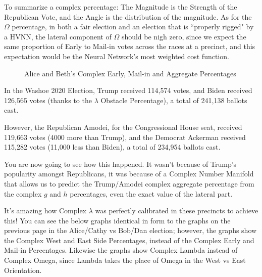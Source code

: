 To summarize a complex percentage: The Magnitude is the Strength of the Republican Vote, and the Angle is the distribution of the magnitude. As for the $\Omega$ percentage, in both a fair election and an election that is ``properly rigged" by a HVNN, the lateral component of $\Omega$ should be nigh zero, since we expect the same proportion of Early to Mail-in votes across the races at a precinct, and this expectation would be the Neural Network's most weighted cost function.
\begin{figure}[bp!]
\begin{center}
\caption{Alice and Beth's Complex Early, Mail-in and Aggregate Percentages}
\noindent{}
\end{center}
\end{figure}
\newpage
In the Washoe 2020 Election, Trump received 114,574 votes, and Biden received 126,565 votes (thanks to the $\lambda$ Obstacle Percentage), a total of 241,138 ballots cast.

However, the Republican Amodei, for the Congressional House seat, received 119,663 votes (4000 more than Trump), and the Democrat Ackerman received 115,282 votes (11,000 less than Biden), a total of 234,954 ballots cast.

You are now going to see how this happened. It wasn't because of Trump's popularity amongst Republicans, it was because of a Complex Number Manifold that allows us to predict the Trump/Amodei complex aggregate percentage from the complex $g$ and $h$ percentages, even the exact value of the lateral part. 

It's amazing how Complex $\lambda$ was perfectly calibrated in these precincts to achieve this! You can see the below graphs identical in form to the graphs on the previous page in the Alice/Cathy vs Bob/Dan election; however, the graphs show the Complex West and East Side Percentages, instead of the Complex Early and Mail-in Percentages. Likewise the graphs show Complex Lambda instead of Complex Omega, since Lambda takes the place of Omega in the West vs East Orientation.

